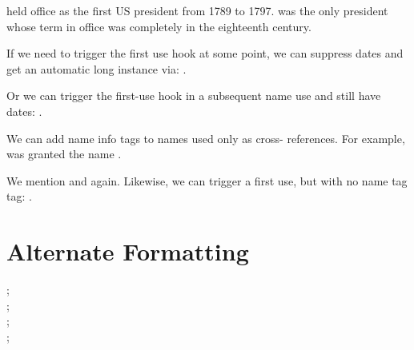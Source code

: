 \documentclass[oneside]{article}
\begin{document}

\newif\ifNoTag


\renewcommand*\NamesFormat[1]
{%
  #1\unless\ifNoTag\NameQueryInfo{}\fi
  \global\NoTagfalse%
}

\ForgetThis{} held office as
the first US president from 1789 to 1797.
 was the only president whose
term in office was completely in the eighteenth century.

If we need to trigger the first use hook at some point,
we can suppress dates and get an automatic long instance via:
\NoTagtrue\ForgetThis{}.

Or we can trigger the first-use hook in a subsequent name use
and still have dates: \ForceName{}.

We can add name info tags to names used only as cross-
references. For example,  was granted
the name .

We mention 
and  again. Likewise, we can trigger a
first use, but with no name tag tag:
\NoTagtrue\ForgetThis{}.

%
%

\section{Alternate Formatting}

\AltFormatActive
\renewcommand*\NamesFormat{}
\renewcommand*\MainNameHook{\AltOff}

\noindent
\ForgetThis{};
\\
\ForgetThis{};
\\
\ForgetThis{};
\\
\ForgetThis{};
\end{document}
